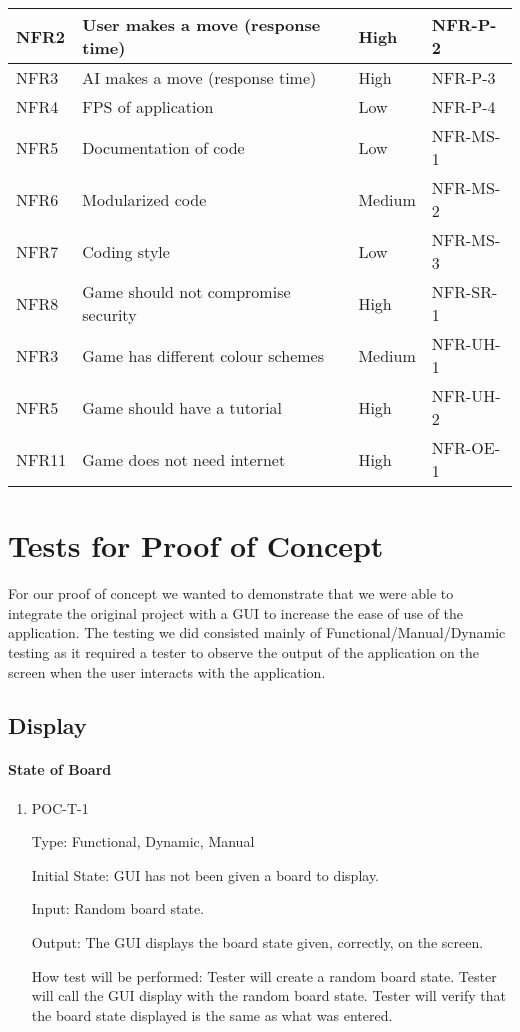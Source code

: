 \documentclass[12pt, titlepage]{article}
\begin{document}
\begin{table}[htbp]
\begin{center}
\begin{adjustwidth}{-1.5cm}{}
\begin{tabularx}{1.2\textwidth}{|p{3.4cm}|p{7cm}|p{1.6cm}|X|}
		\hline
		NFR2 & User makes a move (response time) & High & NFR-P-2 \\
		\hline
		NFR3 & AI makes a move (response time) & High & NFR-P-3 \\
		\hline
		NFR4 & FPS of application & Low & NFR-P-4 \\
		\hline
		NFR5 & Documentation of code & Low & NFR-MS-1 \\
		\hline
		NFR6 & Modularized code & Medium & NFR-MS-2 \\
		\hline
		NFR7 & Coding style & Low & NFR-MS-3 \\
		\hline
		NFR8 & Game should not compromise security & High & NFR-SR-1 \\
		\hline
		NFR3 & Game has different colour schemes & Medium & NFR-UH-1\\
		\hline
		NFR5 & Game should have a tutorial & High & NFR-UH-2\\
		\hline
		NFR11 & Game does not need internet & High & NFR-OE-1\\
		\hline
	\end{tabularx}
	\end{adjustwidth}
	\end{center}
\end{table}


\section{Tests for Proof of Concept}
For our proof of concept we wanted to demonstrate that we were able to integrate the original project with a GUI to increase the ease of use of the application. The testing we did consisted mainly of Functional/Manual/Dynamic testing as it required a tester to observe the output of the application on the screen when the user interacts with the application.

\subsection{Display}
		
\paragraph{State of Board}
\begin{enumerate}
\item{POC-T-1}

Type: Functional, Dynamic, Manual

Initial State: GUI has not been given a board to display.
					
Input: Random board state.
					
Output: The GUI displays the board state given, correctly, on the screen.
					
How test will be performed: Tester will create a random board state. Tester will call the GUI display with the random board state. Tester will verify that the board state displayed is the same as what was entered.
\end{enumerate}
\end{document}
